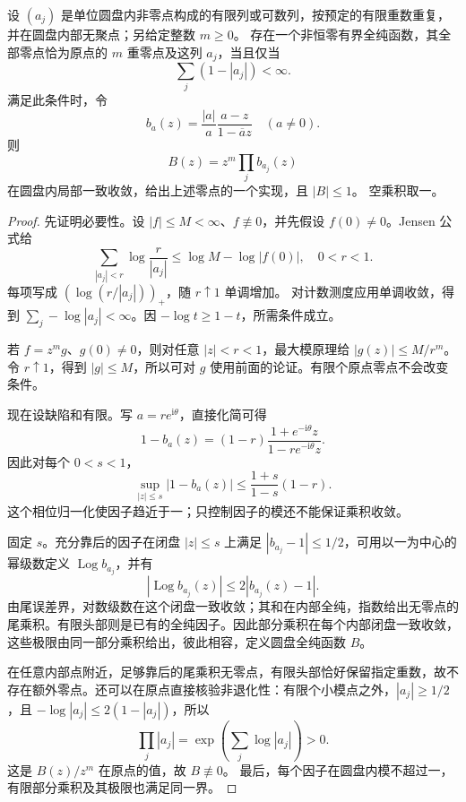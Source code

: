 \begin{theorem}\label{b3:thm:18-blaschke-zeros}
设 \((a_j)\) 是单位圆盘内非零点构成的有限列或可数列，按预定的有限重数重复，并在圆盘内部无聚点；另给定整数 \(m\ge0\)。
存在一个非恒零有界全纯函数，其全部零点恰为原点的 \(m\) 重零点及这列 \(a_j\)，当且仅当
\begin{equation}\label{b3:eq:18-blaschke-condition}
 \sum_j(1-|a_j|)<\infty.
\end{equation}
满足此条件时，令
\[
 b_a(z)=\frac{|a|}{a}\frac{a-z}{1-\overline a z}\quad(a\ne0).
\]
则
\begin{equation}\label{b3:eq:18-blaschke-product}
 B(z)=z^m\prod_j b_{a_j}(z)
\end{equation}
在圆盘内局部一致收敛，给出上述零点的一个实现，且 \(|B|\le1\)。
空乘积取一。
\end{theorem}
\begin{proof}
先证明必要性。设 \(|f|\le M<\infty\)、\(f\not\equiv0\)，并先假设 \(f(0)\ne0\)。Jensen 公式给
\[
 \sum_{|a_j|<r}\log\frac r{|a_j|}
 \le\log M-\log|f(0)|,\quad 0<r<1.
\]
每项写成 \((\log(r/|a_j|))_+\)，随 \(r\uparrow1\) 单调增加。
对计数测度应用单调收敛，得到
\(\sum_j-\log|a_j|<\infty\)。因 \(-\log t\ge1-t\)，所需条件成立。

若 \(f=z^m g\)、\(g(0)\ne0\)，则对任意 \(|z|<r<1\)，最大模原理给
\(|g(z)|\le M/r^m\)。令 \(r\uparrow1\)，得到 \(|g|\le M\)，所以可对 \(g\) 使用前面的论证。有限个原点零点不会改变条件。

现在设缺陷和有限。写 \(a=re^{\mathrm i\theta}\)，直接化简可得
\[
 1-b_a(z)=(1-r)\frac{1+e^{-\mathrm i\theta}z}
                         {1-r e^{-\mathrm i\theta}z}.
\]
因此对每个 \(0<s<1\)，
\begin{equation}\label{b3:eq:18-blaschke-tail-bound}
 \sup_{|z|\le s}|1-b_a(z)|
 \le\frac{1+s}{1-s}(1-r).
\end{equation}
这个相位归一化使因子趋近于一；只控制因子的模还不能保证乘积收敛。

固定 \(s\)。充分靠后的因子在闭盘 \(|z|\le s\) 上满足
\(|b_{a_j}-1|\le1/2\)，可用以一为中心的幂级数定义
\(\operatorname{Log}b_{a_j}\)，并有
\[
 |\operatorname{Log}b_{a_j}(z)|\le2|b_{a_j}(z)-1|.
\]
由尾误差界，对数级数在这个闭盘一致收敛；其和在内部全纯，指数给出无零点的尾乘积。有限头部则是已有的全纯因子。因此部分乘积在每个内部闭盘一致收敛，这些极限由同一部分乘积给出，彼此相容，定义圆盘全纯函数 \(B\)。

在任意内部点附近，足够靠后的尾乘积无零点，有限头部恰好保留指定重数，故不存在额外零点。还可以在原点直接核验非退化性：有限个小模点之外，\(|a_j|\ge1/2\)，且
\(-\log|a_j|\le2(1-|a_j|)\)，所以
\[
 \prod_j|a_j|=\exp\left(\sum_j\log|a_j|\right)>0.
\]
这是 \(B(z)/z^m\) 在原点的值，故 \(B\not\equiv0\)。
最后，每个因子在圆盘内模不超过一，有限部分乘积及其极限也满足同一界。
\end{proof}

